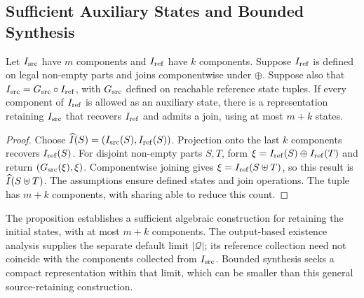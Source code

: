 \documentclass[acmsmall,screen,review,anonymous,nonacm]{acmart}
\begin{document}
\subsection{Sufficient Auxiliary States and Bounded Synthesis}
\begin{proposition}
\label{prop:supplement}
Let $I_{\mathrm{src}}$ have $m$ components and $I_{\mathrm{ref}}$ have $k$ components.
Suppose $I_{\mathrm{ref}}$ is defined on legal non-empty parts and joins componentwise under $\oplus$.
Suppose also that $I_{\mathrm{src}}=G_{\mathrm{src}}\circ I_{\mathrm{ref}}$, with $G_{\mathrm{src}}$ defined on reachable reference state tuples.
If every component of $I_{\mathrm{ref}}$ is allowed as an auxiliary state, there is a representation retaining $I_{\mathrm{src}}$ that recovers $I_{\mathrm{ref}}$ and admits a join, using at most $m+k$ states.
\end{proposition}
\begin{proof}
Choose $\widehat{I}(S)=(I_{\mathrm{src}}(S),I_{\mathrm{ref}}(S))$.
Projection onto the last $k$ components recovers $I_{\mathrm{ref}}(S)$.
For disjoint non-empty parts $S,T$, form $\xi=I_{\mathrm{ref}}(S)\oplus I_{\mathrm{ref}}(T)$ and return $(G_{\mathrm{src}}(\xi),\xi)$.
Componentwise joining gives $\xi=I_{\mathrm{ref}}(S\uplus T)$, so this result is $\widehat{I}(S\uplus T)$.
The assumptions ensure defined states and join operations.
The tuple has $m+k$ components, with sharing able to reduce this count.
\end{proof}

The proposition establishes a sufficient algebraic construction for retaining the initial states, with at most $m+k$ components.
The output-based existence analysis supplies the separate default limit $|\mathcal Q|$; its reference collection need not coincide with the components collected from $I_{\mathrm{src}}$.
Bounded synthesis seeks a compact representation within that limit, which can be smaller than this general source-retaining construction.
\end{document}
